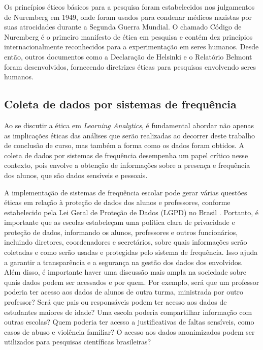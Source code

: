 Os princípios éticos básicos para a pesquisa foram estabelecidos nos julgamentos de Nuremberg em 1949, onde foram usados para condenar médicos nazistas por suas atrocidades durante a Segunda Guerra Mundial. O chamado Código de Nuremberg é o primeiro manifesto de ética em pesquisa e contém dez princípios internacionalmente reconhecidos para a experimentação em seres humanos. Desde então, outros documentos como a Declaração de Helsinki \cite{Helsinki} e o Relatório Belmont \cite{belmont} foram desenvolvidos, fornecendo diretrizes éticas para pesquisas envolvendo seres humanos.


\subsection{Coleta de dados por sistemas de frequência}

Ao se discutir a ética em \textit{Learning Analytics}, é fundamental abordar não apenas as implicações éticas das análises que serão realizadas ao decorrer deste trabalho de conclusão de curso, mas também a forma como os dados foram obtidos. A coleta de dados por sistemas de frequência desempenha um papel crítico nesse contexto, pois envolve a obtenção de informações sobre a presença e frequência dos alunos, que são dados sensíveis e pessoais.

A implementação de sistemas de frequência escolar pode gerar várias questões éticas em relação à proteção de dados dos alunos e professores, conforme estabelecido pela Lei Geral de Proteção de Dados (LGPD) no Brasil \cite{LGPD}. Portanto, é importante que as escolas estabeleçam uma política clara de privacidade e proteção de dados, informando os alunos, professores e outros funcionários, incluindo diretores, coordenadores e secretários, sobre quais informações serão coletadas e como serão usadas e protegidas pelo sistema de frequência. Isso ajuda a garantir a transparência e a segurança na gestão dos dados dos envolvidos. Além disso, é importante haver uma discussão mais ampla na sociedade sobre quais dados podem ser acessados e por quem. Por exemplo, será que um professor poderia ter acesso aos dados de alunos de outra turma, ministrada por outro professor? Será que pais ou responsáveis podem ter acesso aos dados de estudantes maiores de idade? Uma escola poderia compartilhar informação com outras escolas? Quem poderia ter acesso a justificativas de faltas sensíveis, como casos de abuso e violência familiar? O acesso aos dados anonimizados podem ser utilizados para pesquisas científicas brasileiras? 

